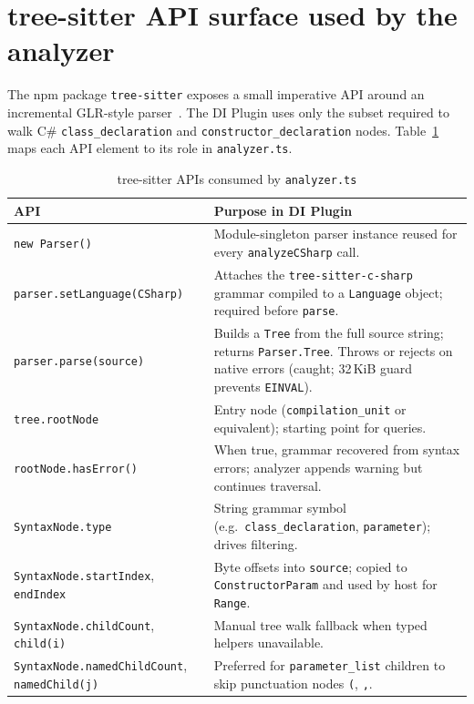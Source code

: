 \section{tree-sitter API surface used by the analyzer}
\label{chap3:treesitter-api}

The npm package \texttt{tree-sitter} exposes a small imperative API around an incremental GLR-style parser~\cite{tree-sitter}. The DI Plugin uses only the subset required to walk C\# \texttt{class\_declaration} and \texttt{constructor\_declaration} nodes. Table~\ref{tab:treesitter-api} maps each API element to its role in \texttt{analyzer.ts}.

\begin{table}[htbp]
\centering
\caption{tree-sitter APIs consumed by \texttt{analyzer.ts}}
\label{tab:treesitter-api}
\small
\begin{tabular}{|p{3.6cm}|p{9.8cm}|}
\hline
\textbf{API} & \textbf{Purpose in DI Plugin} \\
\hline
\texttt{new Parser()} & Module-singleton parser instance reused for every \texttt{analyzeCSharp} call. \\
\hline
\texttt{parser.setLanguage(CSharp)} & Attaches the \texttt{tree-sitter-c-sharp} grammar compiled to a \texttt{Language} object; required before \texttt{parse}. \\
\hline
\texttt{parser.parse(source)} & Builds a \texttt{Tree} from the full source string; returns \texttt{Parser.Tree}. Throws or rejects on native errors (caught; 32\,KiB guard prevents \texttt{EINVAL}). \\
\hline
\texttt{tree.rootNode} & Entry node (\texttt{compilation\_unit} or equivalent); starting point for queries. \\
\hline
\texttt{rootNode.hasError()} & When true, grammar recovered from syntax errors; analyzer appends warning but continues traversal. \\
\hline
\texttt{SyntaxNode.type} & String grammar symbol (e.g.\ \texttt{class\_declaration}, \texttt{parameter}); drives filtering. \\
\hline
\texttt{SyntaxNode.startIndex}, \texttt{endIndex} & Byte offsets into \texttt{source}; copied to \texttt{ConstructorParam} and used by host for \texttt{Range}. \\
\hline
\texttt{SyntaxNode.childCount}, \texttt{child(i)} & Manual tree walk fallback when typed helpers unavailable. \\
\hline
\texttt{SyntaxNode.namedChildCount}, \texttt{namedChild(j)} & Preferred for \texttt{parameter\_list} children to skip punctuation nodes \texttt{(}, \texttt{,}. \\

\end{tabular}
\end{table}
